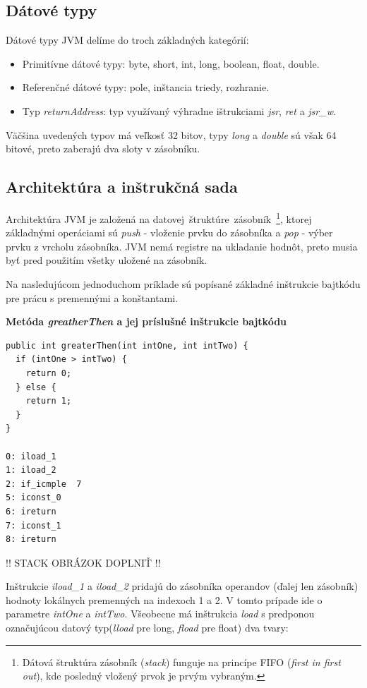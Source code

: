 \documentclass[11pt,final,oneside]{fithesis}
\newenvironment{example}[1]
{
\vspace{5mm}
\noindent\textbf{#1}
\vspace{1mm}
}
{
\vspace{5mm}
}
\begin{document}
\subsection{Dátové typy}
Dátové typy JVM delíme do troch základných
kategórií:

\begin{itemize}
\item Primitívne dátové typy: byte, short, int, long, boolean, float, double.
\item Referenčné dátové typy: pole, inštancia triedy, rozhranie.
\item Typ \textit{returnAddress}: typ využívaný výhradne ištrukciami
\textit{jsr}, \textit{ret} a \textit{jsr\_w}.
\end{itemize}

Väčšina uvedených typov má veľkosť 32 bitov, typy \textit{long} a
\textit{double} sú však 64 bitové, preto zaberajú dva sloty v zásobníku.

\subsection{Architektúra a inštrukčná sada}
Architektúra JVM je založená na datovej~štruktúre~zásobník~\footnote{Dátová
štruktúra zásobník (\textit{stack}) funguje na princípe FIFO (\textit{first in
first out}), kde posledný vložený prvok je prvým vybraným.}, ktorej základnými
operáciami sú \textit{push} - vloženie prvku do zásobníka a \textit{pop} - výber
prvku z vrcholu zásobníka. JVM nemá registre na ukladanie hodnôt, preto musia
byť pred použitím všetky uložené na zásobník.

Na nasledujúcom jednoduchom príklade sú popísané základné inštrukcie bajtkódu
pre prácu s premennými a konštantami.

\begin{example}{Metóda \textit{greatherThen} a jej príslušné inštrukcie
bajtkódu}
\begin{verbatim}
public int greaterThen(int intOne, int intTwo) {
  if (intOne > intTwo) {
    return 0;
  } else {
    return 1;
  }
}

0: iload_1
1: iload_2
2: if_icmple  7
5: iconst_0
6: ireturn
7: iconst_1
8: ireturn
\end{verbatim}
\end{example}

!! 
STACK OBRÁZOK DOPLNIŤ 
!!

Inštrukcie \textit{iload\_1} a \textit{iload\_2} pridajú do zásobníka operandov (ďalej len zásobník) hodnoty lokálnych premenných na indexoch 1 a 2. V tomto 
prípade ide o parametre \textit{intOne} a \textit{intTwo}. Všeobecne má 
inštrukcia \textit{load} s predponou označujúcou datový typ(\textit{lload} pre 
long, \textit{fload} pre float) dva tvary: 
\end{document}
